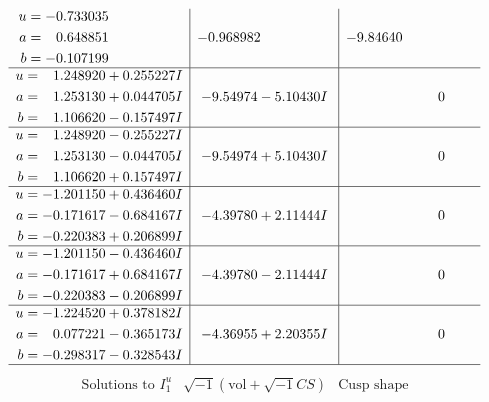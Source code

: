 \documentclass[1p]{elsarticle_modified}
\theoremstyle{definition}
\newcommand{\I}{\sqrt{-1}}
\begin{document}
$$\begin{array}{c|c|c}
\begin{aligned}
u &= -0.733035\phantom{ +0.000000I} \\
a &= \phantom{-}0.648851\phantom{ +0.000000I} \\
b &= -0.107199\phantom{ +0.000000I}\end{aligned}
 & -0.968982\phantom{ +0.000000I} & -9.84640\phantom{ +0.000000I} \\ \hline\begin{aligned}
u &= \phantom{-}1.248920 + 0.255227 I \\
a &= \phantom{-}1.253130 + 0.044705 I \\
b &= \phantom{-}1.106620 - 0.157497 I\end{aligned}
 & -9.54974 - 5.10430 I & \phantom{-0.000000 } 0 \\ \hline\begin{aligned}
u &= \phantom{-}1.248920 - 0.255227 I \\
a &= \phantom{-}1.253130 - 0.044705 I \\
b &= \phantom{-}1.106620 + 0.157497 I\end{aligned}
 & -9.54974 + 5.10430 I & \phantom{-0.000000 } 0 \\ \hline\begin{aligned}
u &= -1.201150 + 0.436460 I \\
a &= -0.171617 - 0.684167 I \\
b &= -0.220383 + 0.206899 I\end{aligned}
 & -4.39780 + 2.11444 I & \phantom{-0.000000 } 0 \\ \hline\begin{aligned}
u &= -1.201150 - 0.436460 I \\
a &= -0.171617 + 0.684167 I \\
b &= -0.220383 - 0.206899 I\end{aligned}
 & -4.39780 - 2.11444 I & \phantom{-0.000000 } 0 \\ \hline\begin{aligned}
u &= -1.224520 + 0.378182 I \\
a &= \phantom{-}0.077221 - 0.365173 I \\
b &= -0.298317 - 0.328543 I\end{aligned}
 & -4.36955 + 2.20355 I & \phantom{-0.000000 } 0\\
 \hline 
 \end{array}$$\newpage$$\begin{array}{c|c|c}  
\text{Solutions to }I^u_{1}& \I (\text{vol} + \sqrt{-1}CS) & \text{Cusp shape}\\
 \hline 
\begin{aligned}

\end{aligned}
\end{array}$$
\end{document}
